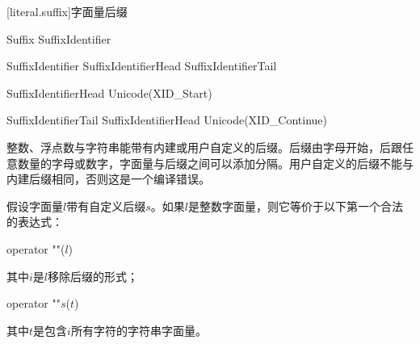 [literal.suffix]{字面量后缀}

\begin{bnf}{Suffix}
    \terminal{_}\bnfq SuffixIdentifier
\end{bnf}

\begin{bnf}{SuffixIdentifier}
    SuffixIdentifierHead SuffixIdentifierTail\bnfs
\end{bnf}

\begin{bnf}{SuffixIdentifierHead}
    Unicode(XID_Start)
\end{bnf}

\begin{bnf}{SuffixIdentifierTail}
    SuffixIdentifierHead \br
    Unicode(XID_Continue)
\end{bnf}

\pnum
整数、浮点数与字符串能带有内建或用户自定义的后缀。后缀由字母开始，后跟任意数量的字母或数字，字面量与后缀之间可以添加\tcode{_}分隔。用户自定义的后缀不能与内建后缀相同，否则这是一个编译错误。

\pnum
假设字面量$l$带有自定义后缀$s$。如果$l$是整数字面量，则它等价于以下第一个合法的表达式：
\begin{codeblock}
    operator ""($l$)
\end{codeblock}
其中$i$是$l$移除后缀的形式；
\begin{codeblock}
    operator ""$s$($t$)
\end{codeblock}
其中$t$是包含$i$所有字符的字符串字面量。